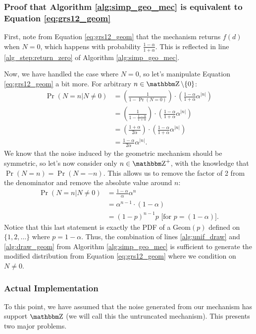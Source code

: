 \documentclass[11pt]{scrartcl} %
\begin{document}
\subsubsection{Proof that Algorithm \ref{alg:simp_geo_mec} is equivalent to Equation \eqref{eq:grs12_geom}}
First, note from Equation \eqref{eq:grs12_geom} that the mechanism returns $f(d)$ when $N=0$,
which happens with probability $\frac{1-\alpha}{1+\alpha}$.
This is reflected in line \ref{alg_step:return_zero} of Algorithm \ref{alg:simp_geo_mec}. \newline

Now, we have handled the case where $N = 0$, so let's manipulate Equation \eqref{eq:grs12_geom} a bit more.
For arbitrary $n \in \Z \setminus \{0\}$:
\begin{align*}
    \Pr(N = n \vert N \neq 0) &= \left( \frac{1}{1 - \Pr(N = 0)} \right) \cdot \left( \frac{1-\alpha}{1+\alpha} \alpha^{| n |} \right) \\
               &= \left( \frac{1}{1 - \frac{1-\alpha}{1+\alpha}} \right) \cdot \left( \frac{1-\alpha}{1+\alpha} \alpha^{| n |} \right) \\
               &= \left( \frac{1 + \alpha}{2\alpha} \right) \cdot \left( \frac{1-\alpha}{1+\alpha} \alpha^{| n |} \right) \\
               &= \frac{1-\alpha}{2\alpha} \alpha^{|n|}.
\end{align*}
We know that the noise induced by the geometric mechanism should be symmetric, so let's now
consider only $n \in \Z^{+}$, with the knowledge that $\Pr(N=n) = \Pr(N=-n)$. This allows us
to remove the factor of 2 from the denominator and remove the absolute value around $n$:
\begin{align*}
    \Pr(N = n | N \neq 0) &= \frac{1-\alpha}{\alpha} \alpha^{n} \\
               &= \alpha^{n-1} \cdot (1-\alpha) \\
               &= (1-p)^{n-1} p \text{ [for $p = (1 - \alpha)$]}.
\end{align*}
Notice that this last statement is exactly the PDF of a Geom$(p)$ defined on $\{1,2,\hdots\}$ where
$p = 1-\alpha$. Thus, the combination of lines \ref{alg:unif_draw} and \ref{alg:draw_geom} from
Algorithm \ref{alg:simp_geo_mec} is sufficient to generate the modified distribution from
Equation \eqref{eq:grs12_geom} where we condition on $N \neq 0$.

\subsubsection{Actual Implementation}
To this point, we have assumed that the noise generated from our mechanism has support
$\Z$ (we will call this the untruncated mechanism). This presents two major problems. \newline
\end{document}
